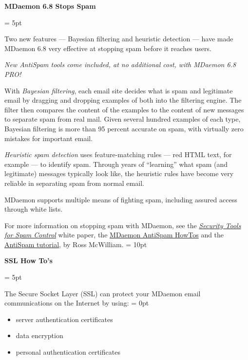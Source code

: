 \documentclass[10pt]{article}
\begin{document}
\begin{minipage}[t]{.66\linewidth}
\begin{center}
\hypertarget{antispam}{\textbf{{\Large MDaemon 6.8 Stops Spam}}}
\end{center}
\parskip = 5pt

Two new features --- Bayesian filtering and heuristic detection --- have made MDaemon 6.8 very effective at stopping spam before it reaches users.

\begin{center}
\parbox[t]{.60\linewidth}{\textsl{New AntiSpam tools come included, at no additional cost, with
MDaemon 6.8 PRO!}}
\end{center}

With \textsl{Bayesian filtering}, each email site decides what is spam and legitimate email by dragging and dropping examples of both into the filtering engine. The filter then compares the content of the examples to the content of new messages to separate spam from real mail. Given several hundred examples of each type, Bayesian filtering is more than 95 percent accurate on spam, with virtually zero mistakes for important email.

\textsl{Heuristic spam detection} uses feature-matching rules --- red HTML text, for example --- to identify spam. Through years of ``learning'' what spam (and legitimate) messages typically look like, the heuristic rules have become very reliable in separating spam from normal email.

MDaemon supports multiple means of fighting spam, including assured access through white lists.

For more information on stopping spam with MDaemon, see the \href{http://www.altn.com/support/white\_papers.asp?product\_id=MDaemon#8}{\emph{Security Tools for Spam Control}} white paper, the \href{http://files.altn.com/HowTo/}{MDaemon AntiSpam HowTos} and the \href{http://files.altn.com/HowTo/SpamFilteringTutorialZS.pdf}{AntiSpam tutorial}, by Ross McWilliam.
\parskip = 10pt

\begin{center}
\hypertarget{ssltutorial}{\textbf{{\Large SSL How To's}}}
\end{center}
\parskip = 5pt

The Secure Socket Layer (SSL) can protect your MDaemon email communications on the Internet by using:
\parskip = 0pt

\begin{itemize}
\parskip = 0pt
\item server authentication certificates
\item data encryption
\item personal authentication certificates
\end{itemize}



\end{minipage}
\end{document}
